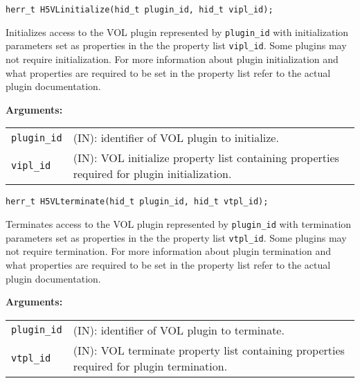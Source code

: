 \begin{lstlisting}
herr_t H5VLinitialize(hid_t plugin_id, hid_t vipl_id);
\end{lstlisting}
Initializes access to the VOL plugin represented by {\tt plugin\_id} with initialization parameters set as properties in the the property list {\tt vipl\_id}. Some plugins may not require initialization. For more information about plugin initialization and what properties are required to be set in the property list refer to the actual plugin documentation.

\textbf{Arguments:}\\
\begin{tabular}{l p{10cm}}
 {\tt plugin\_id} & (IN): identifier of VOL plugin to initialize.\\
 {\tt vipl\_id} & (IN): VOL initialize property list containing properties required for plugin initialization.\\
\end{tabular}

\begin{lstlisting}
herr_t H5VLterminate(hid_t plugin_id, hid_t vtpl_id);
\end{lstlisting}

Terminates access to the VOL plugin represented by {\tt plugin\_id} with termination parameters set as properties in the the property list {\tt vtpl\_id}. Some plugins may not require termination. For more information about plugin termination and what properties are required to be set in the property list refer to the actual plugin documentation.

\textbf{Arguments:}\\
\begin{tabular}{l p{10cm}}
 {\tt plugin\_id} & (IN): identifier of VOL plugin to terminate.\\
 {\tt vtpl\_id} & (IN): VOL terminate property list containing properties required for plugin termination.\\
\end{tabular}


